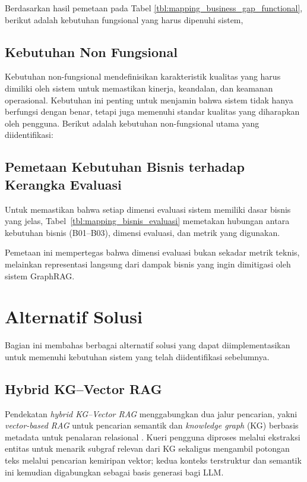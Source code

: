 
Berdasarkan hasil pemetaan pada Tabel \ref{tbl:mapping_business_gap_functional}, berikut adalah kebutuhan fungsional yang harus dipenuhi sistem,


\subsection{Kebutuhan Non Fungsional}
Kebutuhan non-fungsional mendefinisikan karakteristik kualitas yang harus dimiliki oleh sistem untuk memastikan kinerja, keandalan, dan keamanan operasional. Kebutuhan ini penting untuk menjamin bahwa sistem tidak hanya berfungsi dengan benar, tetapi juga memenuhi standar kualitas yang diharapkan oleh pengguna. Berikut adalah kebutuhan non-fungsional utama yang diidentifikasi:


\subsection{Pemetaan Kebutuhan Bisnis terhadap Kerangka Evaluasi}

Untuk memastikan bahwa setiap dimensi evaluasi sistem memiliki dasar bisnis yang jelas, Tabel~\ref{tbl:mapping_bisnis_evaluasi} memetakan hubungan antara kebutuhan bisnis (B01--B03), dimensi evaluasi, dan metrik yang digunakan.



Pemetaan ini mempertegas bahwa dimensi evaluasi bukan sekadar metrik teknis, melainkan representasi langsung dari dampak bisnis yang ingin dimitigasi oleh sistem GraphRAG.

\section{Alternatif Solusi}
Bagian ini membahas berbagai alternatif solusi yang dapat diimplementasikan untuk memenuhi kebutuhan sistem yang telah diidentifikasi sebelumnya.

\subsection{Hybrid KG--Vector RAG}
Pendekatan \textit{hybrid KG--Vector RAG} menggabungkan dua jalur pencarian, yakni \textit{vector-based RAG} untuk pencarian semantik dan \textit{knowledge graph} (KG) berbasis metadata untuk penalaran relasional \parencite{wan2025empowering}. Kueri pengguna diproses melalui ekstraksi entitas untuk menarik subgraf relevan dari KG sekaligus mengambil potongan teks melalui pencarian kemiripan vektor; kedua konteks terstruktur dan semantik ini kemudian digabungkan sebagai basis generasi bagi LLM.

